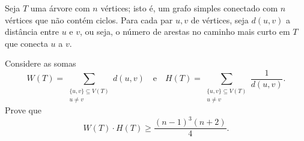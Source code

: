 Seja \(T\) uma árvore com \(n\) vértices; isto é, um grafo simples conectado com \(n\) vértices que não contém ciclos. Para cada par \(u, v\) de vértices, seja \(d(u,v)\) a distância entre \(u\) e \(v\), ou seja, o número de arestas no caminho mais curto em \(T\) que conecta \(u\) a \(v\).

Considere as somas
\[
W(T) = \sum_{\substack{\{u,v\} \subseteq V(T) \\ u \ne v}} d(u,v) \quad \text{e} \quad H(T) = \sum_{\substack{\{u,v\} \subseteq V(T) \\ u \ne v}} \frac{1}{d(u,v)}.
\]
Prove que
\[
W(T) \cdot H(T) \ge \frac{(n-1)^3(n+2)}{4}.
\]
